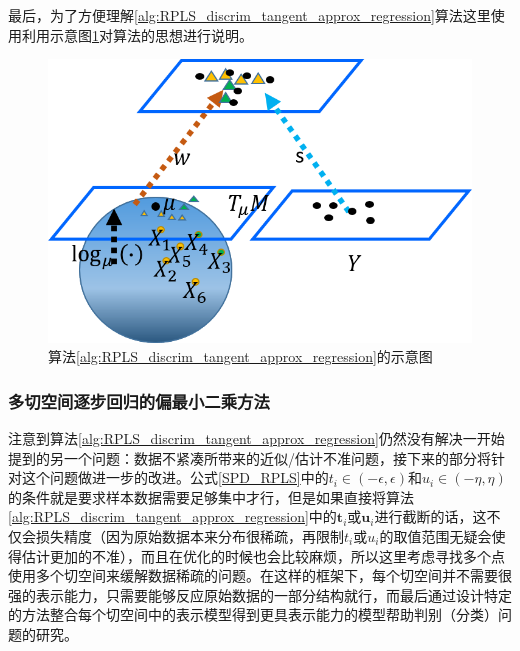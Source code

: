 最后，为了方便理解\ref{alg:RPLS_discrim_tangent_approx_regression}算法这里使用利用示意图\ref{fig:discrim_tangent_RPLS}对算法的思想进行说明。
\begin{figure}
	\centering
	\includegraphics[width=0.5\linewidth]{source/Discrim_Tangent_PLS.png}
	\caption{算法\ref{alg:RPLS_discrim_tangent_approx_regression}的示意图}
	\label{fig:discrim_tangent_RPLS}
\end{figure}
\subsubsection{多切空间逐步回归的偏最小二乘方法}
\label{sec:muliti_tangent_rpls}
注意到算法\ref{alg:RPLS_discrim_tangent_approx_regression}仍然没有解决一开始提到的另一个问题：数据不紧凑所带来的近似/估计不准问题，接下来的部分将针对这个问题做进一步的改进。公式\ref{SPD_RPLS}中的$t_i \in (-\epsilon,\epsilon)$和$u_i \in (-\eta,\eta)$的条件就是要求样本数据需要足够集中才行，但是如果直接将算法\ref{alg:RPLS_discrim_tangent_approx_regression}中的$\bm{t}_i$或$\bm{u}_i$进行截断的话，这不仅会损失精度（因为原始数据本来分布很稀疏，再限制$t_i$或$u_i$的取值范围无疑会使得估计更加的不准），而且在优化的时候也会比较麻烦，所以这里考虑寻找多个点使用多个切空间来缓解数据稀疏的问题。在这样的框架下，每个切空间并不需要很强的表示能力，只需要能够反应原始数据的一部分结构就行，而最后通过设计特定的方法整合每个切空间中的表示模型得到更具表示能力的模型帮助判别（分类）问题的研究。

